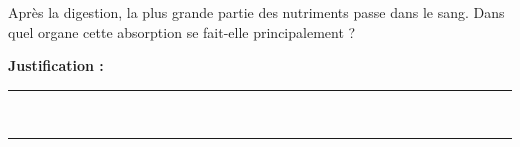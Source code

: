 Après la digestion, la plus grande partie des nutriments passe dans le sang. Dans quel organe cette absorption se fait-elle principalement ?

\choices

\noindent\textbf{Justification :} \hrulefill \\[2.5ex]
\rule{\linewidth}{0.4pt} \\[2.5ex]
\rule{\linewidth}{0.4pt}
\vfill
